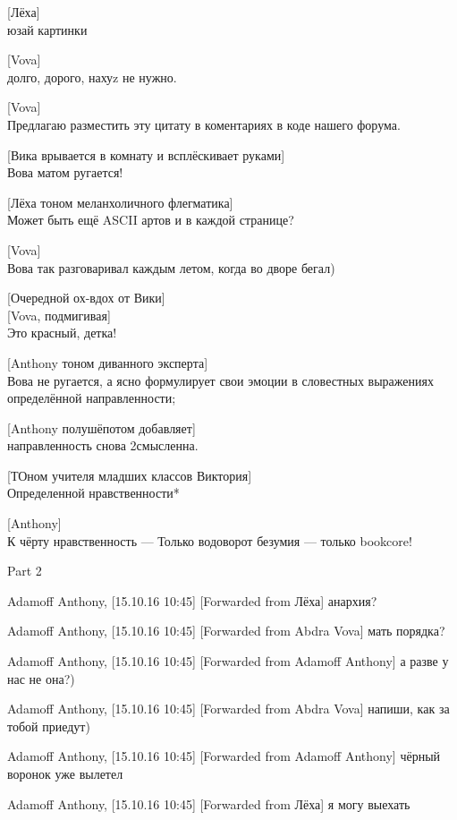 [Лёха]\\
юзай картинки


[Vova]\\
долго, дорого, нахуz не нужно.


[Vova]\\
Предлагаю разместить эту цитату в коментариях в коде нашего форума.


[Вика врывается в комнату и всплёскивает руками]\\
Вова матом ругается!


[Лёха тоном меланхоличного флегматика]\\
Может быть ещё ASCII артов и в каждой странице?


[Vova]\\
Вова так разговаривал каждым летом, когда во дворе бегал)


[Очередной ох-вдох от Вики]\\


[Vova, подмигивая]\\
Это красный, детка!


[Anthony тоном диванного эксперта]\\
Вова не ругается, а ясно формулирует свои эмоции в словестных выражениях определённой направленности;


[Anthony полушёпотом добавляет]\\
направленность снова 2смысленна.


[ТОном учителя младших классов Виктория]\\
Определенной нравственности*


[Anthony]\\
К чёрту нравственность --- Только водоворот безумия --- только bookcore!


\begin{center}
\large Part 2
\end{center}


Adamoff Anthony, [15.10.16 10:45]
[Forwarded from Лёха]
анархия?

Adamoff Anthony, [15.10.16 10:45]
[Forwarded from Abdra Vova]
мать порядка?

Adamoff Anthony, [15.10.16 10:45]
[Forwarded from Adamoff Anthony]
а разве у нас не она?)

Adamoff Anthony, [15.10.16 10:45]
[Forwarded from Abdra Vova]
напиши, как за тобой приедут)

Adamoff Anthony, [15.10.16 10:45]
[Forwarded from Adamoff Anthony]
чёрный воронок уже вылетел

Adamoff Anthony, [15.10.16 10:45]
[Forwarded from Лёха]
я могу выехать

